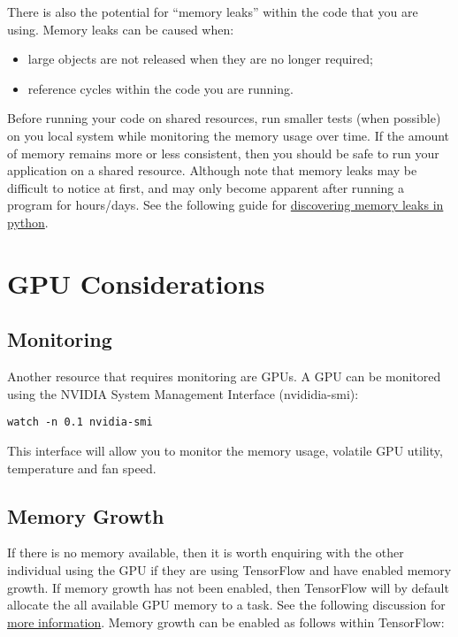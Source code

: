 \documentclass[
]{book}
\providecommand{\tightlist}{%
  \setlength{\itemsep}{0pt}\setlength{\parskip}{0pt}}
\begin{document}
There is also the potential for ``memory leaks'' within the code that you are using. Memory leaks can be caused when:

\begin{itemize}
\tightlist
\item
  large objects are not released when they are no longer required;
\item
  reference cycles within the code you are running.
\end{itemize}

Before running your code on shared resources, run smaller tests (when possible) on you local system while monitoring the memory usage over time. If the amount of memory remains more or less consistent, then you should be safe to run your application on a shared resource. Although note that memory leaks may be difficult to notice at first, and may only become apparent after running a program for hours/days. See the following guide for \href{https://medium.com/zendesk-engineering/hunting-for-memory-leaks-in-python-applications-6824d0518774}{discovering memory leaks in python}.

\hypertarget{gpu-considerations}{%
\section{GPU Considerations}\label{gpu-considerations}}

\hypertarget{monitoring}{%
\subsection{Monitoring}\label{monitoring}}

Another resource that requires monitoring are GPUs. A GPU can be monitored using the NVIDIA System Management Interface (nvididia-smi):

\begin{verbatim}
watch -n 0.1 nvidia-smi
\end{verbatim}

This interface will allow you to monitor the memory usage, volatile GPU utility, temperature and fan speed.

\hypertarget{memory-growth}{%
\subsection{Memory Growth}\label{memory-growth}}

If there is no memory available, then it is worth enquiring with the other individual using the GPU if they are using TensorFlow and have enabled memory growth. If memory growth has not been enabled, then TensorFlow will by default allocate the all available GPU memory to a task. See the following discussion for \href{https://stackoverflow.com/questions/34199233/how-to-prevent-tensorflow-from-allocating-the-totality-of-a-gpu-memory}{more information}. Memory growth can be enabled as follows within TensorFlow:
\end{document}
